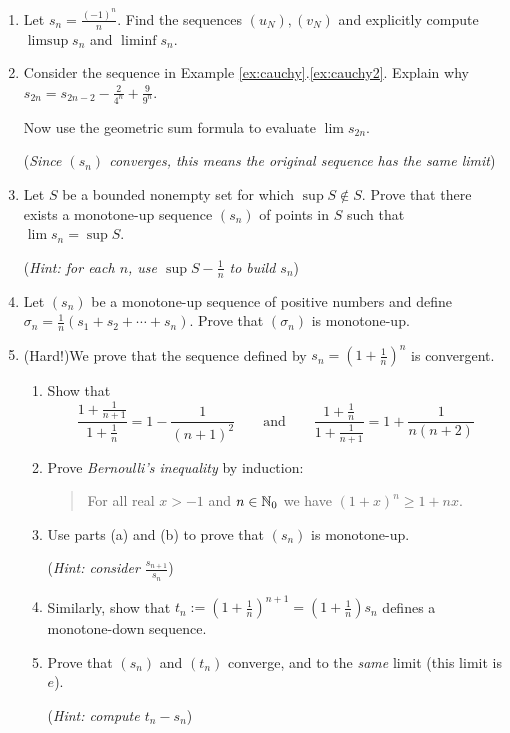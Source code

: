 \begin{exercises}{}{}
\begin{enumerate}
	
		\item Let $s_n=\frac{(-1)^n}n$. Find the sequences $(u_N),(v_N)$ and explicitly compute $\limsup s_n$ and $\liminf s_n$.
	  
	  
	  \item\label{exs:cauchygeomeval} Consider the sequence in Example \ref*{ex:cauchy}.\ref{ex:cauchy2}. Explain why $s_{2n}=s_{2n-2}-\frac 2{4^n}+\frac 9{9^n}$.\par
	  Now use the geometric sum formula to evaluate $\lim s_{2n}$.\par
	  (\emph{Since $(s_n)$ converges, this means the original sequence has the same limit})
	  
	  
	  \item%
	  Let $S$ be a bounded nonempty set for which $\sup S\notin S$. Prove that there exists a monotone-up sequence $(s_n)$ of points in $S$ such that $\lim s_n=\sup S$.\par
	  (\emph{Hint: for each $n$, use $\sup S-\frac 1n$ to build $s_n$})
	  
	  
	  \item%
	  Let $(s_n)$ be a monotone-up sequence of positive numbers and define $\sigma_n=\frac 1n(s_1+s_2+\cdots+s_n)$. Prove that $(\sigma_n)$ is monotone-up.
	
	  
	  
	  \item\label{exs:edefn} (Hard!)\lstsp We prove that the sequence defined by $s_n=\left(1+\frac 1n\right)^n$ is convergent.
	  \begin{enumerate}
	    \item Show that
	    \[
	    	\frac{1+\frac 1{n+1}}{1+\frac 1n}=1-\frac 1{(n+1)^2}
	    	\qquad\text{and}\qquad 
	    	\frac{1+\frac 1n}{1+\frac 1{n+1}}=1+\frac 1{n(n+2)}
	    \]
		  \item Prove \emph{Bernoulli's inequality} by induction:
		  \begin{quote}
		  	For all real $x>-1$ and $n\in\mathbb{N}_0$ we have $(1+x)^n\ge 1+nx$.
		  \end{quote}
			\item Use parts (a) and (b) to prove that $(s_n)$ is monotone-up.\par
			(\emph{Hint: consider $\frac{s_{n+1}}{s_n}$}) 
			\item Similarly, show that $t_n:=\left(1+\frac 1n\right)^{n+1} =\left(1+\frac 1n\right)s_n$ defines a monotone-down sequence.
			\item Prove that $(s_n)$ and $(t_n)$ converge, and to the \emph{same} limit (this limit is $e$).\par
			(\emph{Hint: compute $t_n-s_n$})
		\end{enumerate}
	  
	\end{enumerate}
\end{exercises}

